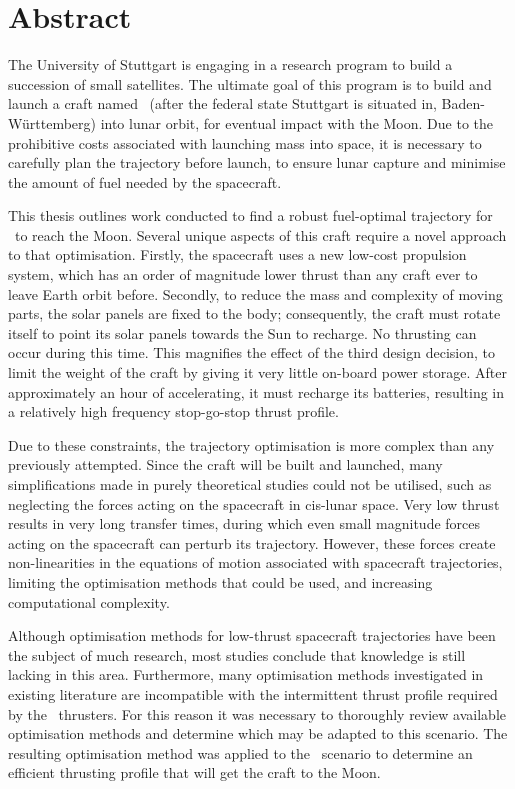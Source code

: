 \chapter*{Abstract}

\vfill

The University of Stuttgart is engaging in a research program to build a succession of small satellites. The ultimate goal of this program is to build and launch a craft named \BW\ (after the federal state Stuttgart is situated in, Baden-W\"{u}rttemberg) into lunar orbit, for eventual impact with the Moon. Due to the prohibitive costs associated with launching mass into space, it is necessary to carefully plan the trajectory before launch, to ensure lunar capture and minimise the amount of fuel needed by the spacecraft.

This thesis outlines work conducted to find a robust fuel-optimal trajectory for \BW\ to reach the Moon. Several unique aspects of this craft require a novel approach to that optimisation. Firstly, the spacecraft uses a new low-cost propulsion system, which has an order of magnitude lower thrust than any craft ever to leave Earth orbit before. Secondly, to reduce the mass and complexity of moving parts, the solar panels are fixed to the body; consequently, the craft must rotate itself to point its solar panels towards the Sun to recharge. No thrusting can occur during this time. This magnifies the effect of the third design decision, to limit the weight of the craft by giving it very little on-board power storage. After approximately an hour of accelerating, it must recharge its batteries, resulting in a relatively high frequency stop-go-stop thrust profile.

Due to these constraints, the trajectory optimisation is more complex than any previously attempted. Since the craft will be built and launched, many simplifications made in purely theoretical studies could not be utilised, such as neglecting the forces acting on the spacecraft in cis-lunar space. Very low thrust results in very long transfer times, during which even small magnitude forces acting on the spacecraft can perturb its trajectory. However, these forces create non-linearities in the equations of motion associated with spacecraft trajectories, limiting the optimisation methods that could be used, and increasing computational complexity.

Although optimisation methods for low-thrust spacecraft trajectories have been the subject of much research, most studies conclude that knowledge is still lacking in this area. Furthermore, many optimisation methods investigated in existing literature are incompatible with the intermittent thrust profile required by the \BW\ thrusters. For this reason it was necessary to thoroughly review available optimisation methods and determine which may be adapted to this scenario. The resulting optimisation method was applied to the \BW\ scenario to determine an efficient thrusting profile that will get the craft to the Moon.

\vfill
